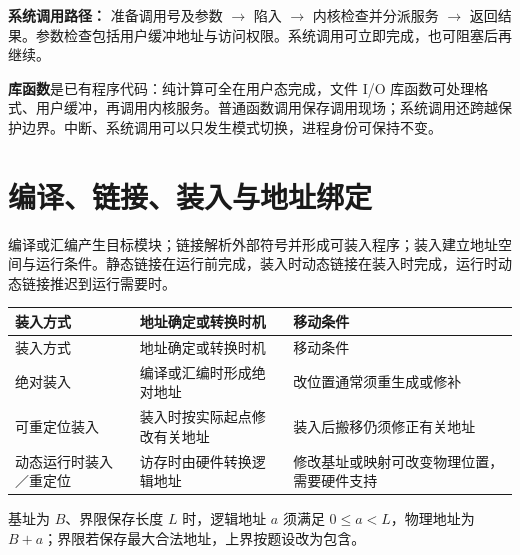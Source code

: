 \textbf{系统调用路径：} 准备调用号及参数 \ensuremath{\to} 陷入 \ensuremath{\to} 内核检查并分派服务 \ensuremath{\to} 返回结果。参数检查包括用户缓冲地址与访问权限。系统调用可立即完成，也可阻塞后再继续。

\textbf{库函数}是已有程序代码：纯计算可全在用户态完成，文件 I/O 库函数可处理格式、用户缓冲，再调用内核服务。普通函数调用保存调用现场；系统调用还跨越保护边界。中断、系统调用可以只发生模式切换，进程身份可保持不变。

\section{编译、链接、装入与地址绑定}\label{OS01-loading}

编译或汇编产生目标模块；链接解析外部符号并形成可装入程序；装入建立地址空间与运行条件。静态链接在运行前完成，装入时动态链接在装入时完成，运行时动态链接推迟到运行需要时。

\par\smallskip
\begin{wideblock}
{\fontsize{9.3}{12}\selectfont\setlength{\tabcolsep}{2.5pt}\setlength{\LTleft}{0pt}\setlength{\LTright}{0pt}
\begin{longtable}{@{}>{\raggedright\arraybackslash}p{}>{\raggedright\arraybackslash}p{}>{\raggedright\arraybackslash}p{}@{}}
\toprule
装入方式 & 地址确定或转换时机 & 移动条件 \\

\midrule\endfirsthead\toprule
装入方式 & 地址确定或转换时机 & 移动条件 \\

\midrule\endhead\bottomrule\endfoot
绝对装入 & 编译或汇编时形成绝对地址 & 改位置通常须重生成或修补 \\

可重定位装入 & 装入时按实际起点修改有关地址 & 装入后搬移仍须修正有关地址 \\

动态运行时装入／重定位 & 访存时由硬件转换逻辑地址 & 修改基址或映射可改变物理位置，需要硬件支持 \\

\end{longtable}}
\end{wideblock}
\par\smallskip

基址为 \(B\)、界限保存长度 \(L\) 时，逻辑地址 \(a\) 须满足 \(0\le a<L\)，物理地址为 \(B+a\)；界限若保存最大合法地址，上界按题设改为包含。

